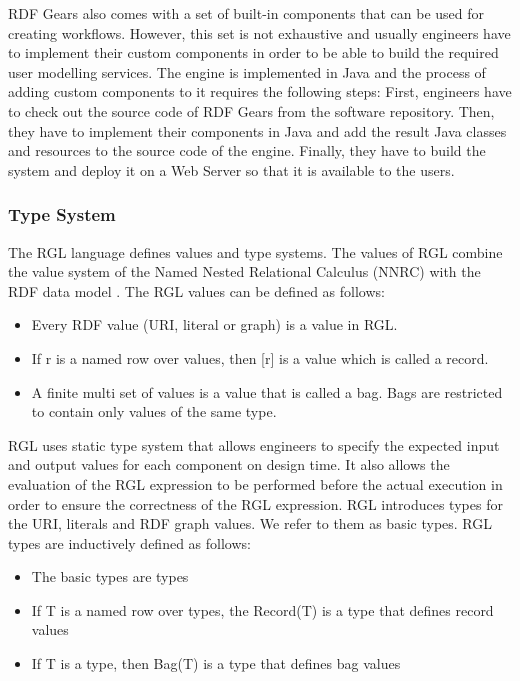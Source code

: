 RDF Gears also comes with a set of built-in components that can be used for creating workflows. However, this set is not exhaustive and usually engineers have to implement their custom components in order to be able to build the required user modelling services. The engine is implemented in Java and the process of adding custom components to it requires the following steps: First, engineers have to check out the source code of RDF Gears from the software repository. Then, they have to implement their components in Java and add the result Java classes and resources to the source code of the engine.  Finally, they have to build the system and deploy it on a Web Server so that it is available to the users.

\subsubsection{Type System}

The RGL language defines values and type systems. The values of RGL combine the value system of the Named Nested Relational Calculus (NNRC) with the RDF data model \cite{feliksik2011}. The RGL values can be defined as follows:

\begin{itemize}
	\item Every RDF value (URI, literal or graph) is a value in RGL.
	
	\item If r is a named row over values, then [r] is a value which is called a record.
	
	\item A finite multi set of values is a value that is called a bag. Bags are restricted to contain only values of the same type.
\end{itemize}

RGL uses static type system that allows engineers to specify the expected input and output values for each component on design time. It also allows the evaluation of the RGL expression to be performed before the actual execution in order to ensure the correctness of the RGL expression. RGL introduces types for the URI, literals and RDF graph values. We refer to them as basic types. RGL types are inductively defined as follows:

\begin{itemize}
	\item The basic types are types
	\item If T is a named row over types, the Record(T) is a type that defines record values
	\item If T is a type, then Bag(T) is a type that defines bag values
\end{itemize}

